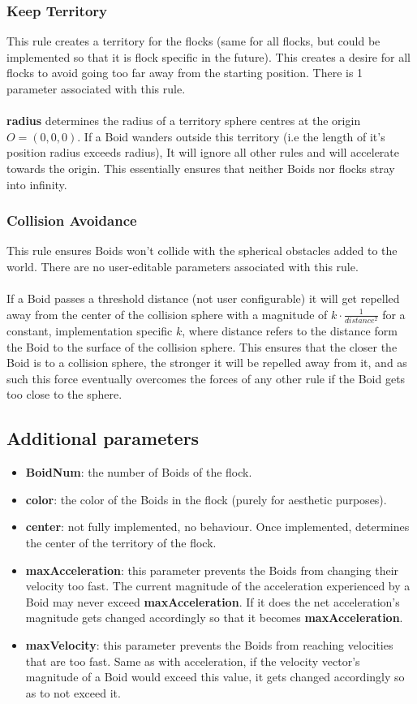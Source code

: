 \documentclass[12pt]{article}
\begin{document}
\subsubsection{Keep Territory}
This rule creates a territory for the flocks (same for all flocks, but could be implemented so that it is flock specific in the future). This creates a desire for all flocks to avoid going too far away from the starting position. There is 1 parameter associated with this rule.
\\ \\
\textbf{radius} determines the radius of a territory sphere centres at the origin $O=(0,0,0)$. If a Boid wanders outside this territory (i.e the length of it's position radius exceeds radius), It will ignore all other rules and will accelerate towards the origin. This essentially ensures that neither Boids nor flocks stray into infinity.

\subsubsection{Collision Avoidance}
This rule ensures Boids won't collide with the spherical obstacles added to the world. There are no user-editable parameters associated with this  rule.
\\ \\
If a Boid passes a threshold distance (not user configurable) it will get repelled away from the center of the collision sphere with a magnitude of $k\cdot \frac{1}{distance^2}$ for a constant, implementation specific $k$, where distance refers to the distance form the Boid to the surface of the collision sphere. This ensures that the closer the Boid is to a collision sphere, the stronger it will be repelled away from it, and as such this force eventually overcomes the forces of any other rule if the Boid gets too close to the sphere.

\subsection{Additional parameters}
\begin{itemize}
	\item \textbf{BoidNum}: the number of Boids of the flock.
	\item \textbf{color}: the color of the Boids in the flock (purely for aesthetic purposes).
	\item \textbf{center}: not fully implemented, no behaviour. Once implemented, determines the center of the territory of the flock.
	\item \textbf{maxAcceleration}: this parameter prevents the Boids from changing their velocity too fast. The current magnitude of the acceleration experienced by a Boid may never exceed \textbf{maxAcceleration}. If it does the net acceleration's magnitude gets changed accordingly so that it becomes \textbf{maxAcceleration}.
	\item \textbf{maxVelocity}: this parameter prevents the Boids from reaching velocities that are too fast. Same as with acceleration, if the velocity vector's magnitude of a Boid would exceed this value, it gets changed accordingly so as to not exceed it. 
\end{itemize}
\end{document}
